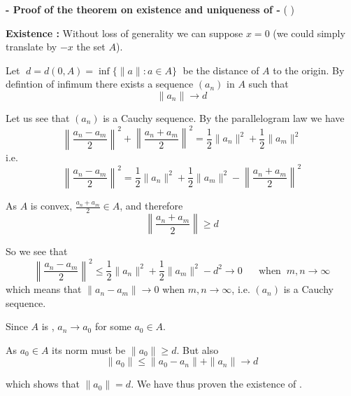 \documentclass[12pt]{article}
\begin{document}
{\bf  - Proof of the theorem on existence and uniqueness of  - } ( )

{\bf Existence :} Without loss of generality we can suppose $x=0$ (we could simply translate by $-x$ the set $A$).

Let $\;d = d(0, A)= \inf\{\|a\| : a \in A\}\;$ be the distance of $A$ to the origin. By defintion of infimum there exists a sequence $(a_n)$ in $A$ such that
\begin{displaymath}
\|a_n\| \longrightarrow d
\end{displaymath}

Let us see that $(a_n)$ is a Cauchy sequence. By the parallelogram law we have
\begin{displaymath}
\left \|\frac{a_n-a_m}{2}\right \|^2+\left\|\frac{a_n+a_m}{2}\right\|^2 = \frac{1}{2}\|a_n\|^2 + \frac{1}{2}\|a_m\|^2
\end{displaymath}
i.e.
\begin{displaymath}
\left\|\frac{a_n-a_m}{2}\right\|^2 = \frac{1}{2}\|a_n\|^2 + \frac{1}{2}\|a_m\|^2-\left\|\frac{a_n+a_m}{2}\right\|^2
\end{displaymath}

As $A$ is convex, $\displaystyle \frac{a_n +a_m}{2} \in A$, and therefore
\begin{displaymath}
\left\|\frac{a_n +a_m}{2}\right\| \geq d
\end{displaymath}

So we see that
\begin{displaymath}
\left\|\frac{a_n-a_m}{2}\right\|^2 \leq \frac{1}{2}\|a_n\|^2 + \frac{1}{2}\|a_m\|^2-d^2 \longrightarrow 0\;\;\;\;\;\; \text{when} \;\; m,n \rightarrow \infty
\end{displaymath}
which means that $\|a_n - a_m\| \longrightarrow 0$ when $m,n \rightarrow \infty$, i.e. $(a_n)$ is a Cauchy sequence.

Since $A$ is , $a_n \longrightarrow a_0$ for some $a_0 \in A$.

As $a_0 \in A$ its norm must be $\|a_0\| \geq d$. But also
\begin{displaymath}
\|a_0\| \leq \|a_0 - a_n \| + \|a_n\| \longrightarrow d
\end{displaymath}

which shows that $\|a_0\| = d$. We have thus proven the existence of .
\end{document}
